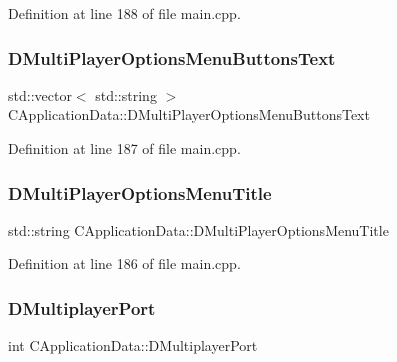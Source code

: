Definition at line 188 of file main.\+cpp.

\hypertarget{classCApplicationData_a400aa1df18482fe5d9f34e861a0dc257}{}\label{classCApplicationData_a400aa1df18482fe5d9f34e861a0dc257} 
\subsubsection{\texorpdfstring{D\+Multi\+Player\+Options\+Menu\+Buttons\+Text}{DMultiPlayerOptionsMenuButtonsText}}
{\footnotesize\ttfamily std\+::vector$<$ std\+::string $>$ C\+Application\+Data\+::\+D\+Multi\+Player\+Options\+Menu\+Buttons\+Text\hspace{0.3cm}{\ttfamily [protected]}}



Definition at line 187 of file main.\+cpp.

\hypertarget{classCApplicationData_aa9c4883274c2313743a42b68c7fc427f}{}\label{classCApplicationData_aa9c4883274c2313743a42b68c7fc427f} 
\subsubsection{\texorpdfstring{D\+Multi\+Player\+Options\+Menu\+Title}{DMultiPlayerOptionsMenuTitle}}
{\footnotesize\ttfamily std\+::string C\+Application\+Data\+::\+D\+Multi\+Player\+Options\+Menu\+Title\hspace{0.3cm}{\ttfamily [protected]}}



Definition at line 186 of file main.\+cpp.

\hypertarget{classCApplicationData_a99bed2c18513304de1cf2a2344bf091f}{}\label{classCApplicationData_a99bed2c18513304de1cf2a2344bf091f} 
\subsubsection{\texorpdfstring{D\+Multiplayer\+Port}{DMultiplayerPort}}
{\footnotesize\ttfamily int C\+Application\+Data\+::\+D\+Multiplayer\+Port\hspace{0.3cm}{\ttfamily [protected]}}



